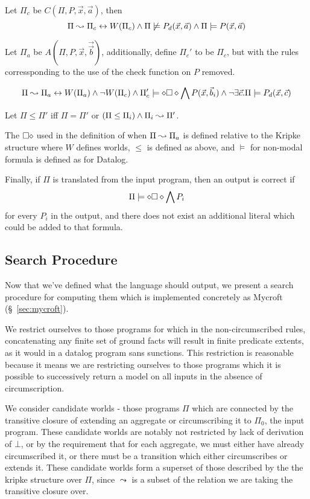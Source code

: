 Let $\Pi_c$ be $C(\Pi, P, \vec{x}, \vec{a})$, then
\[
	\Pi \leadsto \Pi_c \leftrightarrow W(\Pi_c) \wedge \Pi \not \models P_d(\vec{x}, \vec{a}) \wedge \Pi \models P(\vec{x}, \vec{a})
\]

Let $\Pi_a$ be $A(\Pi, P, \vec{x}, \vec{\vec{b}})$, additionally, define $\Pi_c'$ to be $\Pi_c$, but with the rules corressponding to the use of the check function on $P$ removed.

\[
	\Pi \leadsto \Pi_a \leftrightarrow W(\Pi_a) \wedge \neg W(\Pi_c) \wedge \Pi_c' \models \diamond \square \diamond \bigwedge P(\vec{x}, \vec{b}_i) \wedge \neg \exists \vec{c}. \Pi \models P_d(\vec{x}, \vec{c})
\]

Let $\Pi \leq \Pi'$ iff $\Pi = \Pi'$ or $(\Pi \leq \Pi_i) \wedge \Pi_i \leadsto \Pi'$.

The $\square \diamond$ used in the definition of when $\Pi \leadsto \Pi_a$ is defined relative to the Kripke structure where $W$ defines worlds, $\leq$ is defined as above, and $\models$ for non-modal formula is defined as for Datalog.

Finally, if $\Pi$ is translated from the input program, then an output is correct if
\[
	\Pi \models \diamond \square \diamond \bigwedge P_i
\]
for every $P_i$ in the output, and there does not exist an additional literal which could be added to that formula.
\subsection{Search Procedure}
\label{sec:search}
Now that we've defined what the language should output, we present a search procedure for computing them which is implemented concretely as Mycroft (\S~\ref{sec:mycroft}).

We restrict ourselves to those programs for which in the non-circumscribed rules, concatenating any finite set of ground facts will result in finite predicate extents, as it would in a datalog program sans sunctions.
This restriction is reasonable because it means we are restricting ourselves to those programs which it is possible to successively return a model on all inputs in the absence of circumscription.

We consider candidate worlds - those programs $\Pi$ which are connected by the transitive closure of extending an aggregate or circumscribing it to $\Pi_0$, the input program.
These candidate worlds are notably not restricted by lack of derivation of $\bot$, or by the requirement that for each aggregate, we must either have already circumscribed it, or there must be a transition which either circumscribes or extends it.
These candidate worlds form a superset of those described by the the kripke structure over $\Pi$, since $\leadsto$ is a subset of the relation we are taking the transitive closure over.

